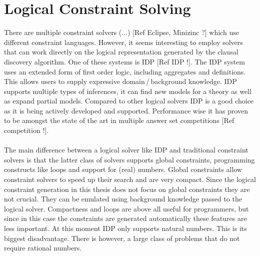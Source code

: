\section{Logical Constraint Solving}
\label{sec:logical_constraint_solving}
There are multiple constraint solvers (...) [Ref Eclipse, Minizinc ?] which use different constraint languages.
However, it seems interesting to employ solvers that can work directly on the logical representation generated by the clausal discovery algorithm.
One of these systems is IDP [Ref IDP !].
The IDP system uses an extended form of first order logic, including aggregates and definitions.
This allows users to supply expressive domain\,/\,background knowledge.
IDP supports multiple types of inferences, it can find new models for a theory as well as expand partial models.
Compared to other logical solvers IDP is a good choice as it is being actively developed and supported.
Performance wise it has proven to be amongst the state of the art in multiple answer set competitions [Ref competition !].
\\\\
The main difference between a logical solver like IDP and traditional constraint solvers is that the latter class of solvers supports global constraints, programming constructs like loops and support for (real) numbers.
Global constraints allow constraint solvers to speed up their search and are very compact.
Since the logical constraint generation in this thesis does not focus on global constraints they are not crucial.
They can be emulated using background knowledge passed to the logical solver.
Compactness and loops are above all useful for programmers, but since in this case the constraints are generated automatically these features are less important.
At this moment IDP only supports natural numbers.
This is its biggest disadvantage.
There is however, a large class of problems that do not require rational numbers.